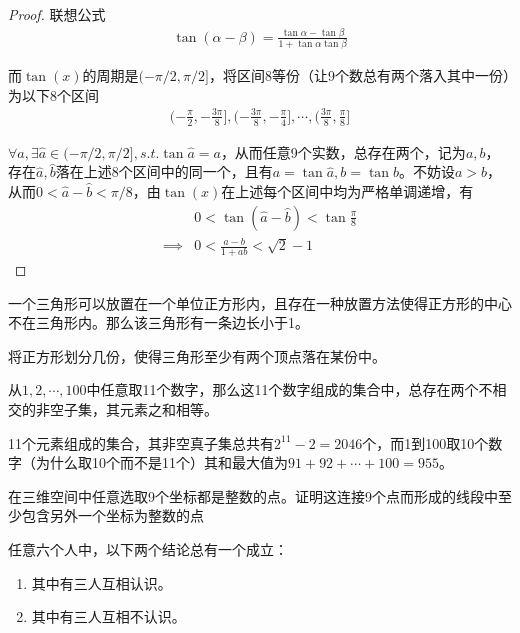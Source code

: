 \begin{proof}
  联想公式
  \begin{align*}
    \tan(\alpha-\beta)=\frac{\tan\alpha-\tan\beta}{1+\tan\alpha\tan\beta}
  \end{align*}

  而$\tan(x)$的周期是$(-\pi/2, \pi/2]$，将区间8等份（让9个数总有两个落入其中一份）为以下8个区间
  \begin{align*}
    (-\frac\pi2, -\frac{3\pi}8], (-\frac{3\pi}8, -\frac\pi4], \cdots, (\frac{3\pi}8, \frac\pi8]
  \end{align*}

  $\forall a, \exists\hat a\in(-\pi/2, \pi/2], s.t. \tan\hat a = a$，从而任意9个实数，总存在两个，记为$a,b$，存在$\hat a, \hat b$落在上述8个区间中的同一个，且有$a=\tan\hat a, b=\tan\hat b$。不妨设$a>b$，从而$0<\hat a-\hat b<\pi/8$，由$\tan(x)$在上述每个区间中均为严格单调递增，有
  \begin{align*}
             & 0 < \tan(\hat a - \hat b) < \tan\frac\pi8\\
    \implies & 0 < \frac{a - b}{1+ab} < \sqrt2 - 1
  \end{align*}
\end{proof}


\begin{question}
  一个三角形可以放置在一个单位正方形内，且存在一种放置方法使得正方形的中心不在三角形内。那么该三角形有一条边长小于1。
\end{question}

\hints 将正方形划分几份，使得三角形至少有两个顶点落在某份中。

\begin{question}
  从$1,2,\cdots,100$中任意取11个数字，那么这11个数字组成的集合中，总存在两个不相交的非空子集，其元素之和相等。
\end{question}

\hints 11个元素组成的集合，其非空真子集总共有$2^{11}-2=2046$个，而1到100取10个数字（\think 为什么取10个而不是11个）其和最大值为$91+92+\cdots+100=955$。

\begin{question}
  在三维空间中任意选取9个坐标都是整数的点。证明这连接9个点而形成的线段中至少包含另外一个坐标为整数的点
\end{question}

\begin{question}
  任意六个人中，以下两个结论总有一个成立：
  \begin{enumerate}
  \item 其中有三人互相认识。
  \item 其中有三人互相不认识。
  \end{enumerate}
\end{question}

